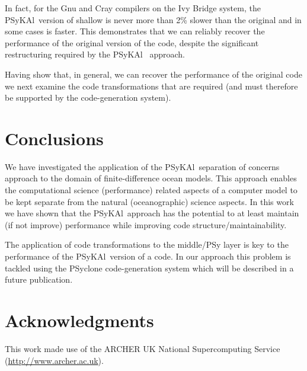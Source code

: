 \documentclass{IOS-Book-Article}
\newcommand{\psykal}{{PS}y{KA}l\ }
\begin{document}
In fact, for the Gnu and Cray compilers on the Ivy Bridge system, the
\psykal version of shallow is never more than 2\% slower than the
original and in some cases is faster.  This demonstrates that we can
reliably recover the performance of the original version of the code,
despite the significant restructuring required by the \psykal
approach.

Having show that, in general, we can recover the performance of the
original code we next examine the code transformations that are required
(and must therefore be supported by the code-generation system).

\section{Conclusions}

We have investigated the application of the \psykal separation of
concerns approach to the domain of finite-difference ocean
models. This approach enables the computational science (performance)
related aspects of a computer model to be kept separate from the
natural (oceanographic) science aspects. In this work we have shown
that the \psykal approach has the potential to at least maintain (if
not improve) performance while improving code
structure/maintainability.

The application of code transformations to the middle/PSy layer is key
to the performance of the \psykal version of a code. In our approach
this problem is tackled using the PSyclone code-generation system
which will be described in a future publication.

\section{Acknowledgments}

This work made use of the ARCHER UK National Supercomputing Service
(\url{http://www.archer.ac.uk}).

{}

\end{document}
